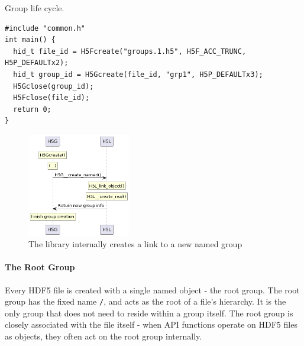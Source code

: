 \begin{listing}
\centering
\caption{Group life cycle.}
\label{lst:group-life-cycle}
\begin{verbatim}
#include "common.h"
int main() {
  hid_t file_id = H5Fcreate("groups.1.h5", H5F_ACC_TRUNC, H5P_DEFAULTx2);
  hid_t group_id = H5Gcreate(file_id, "grp1", H5P_DEFAULTx3);
  H5Gclose(group_id);
  H5Fclose(file_id);
  return 0;
}
\end{verbatim}
\end{listing}

\begin{figure}
    \centering
    \includegraphics[width=0.40\textwidth]{images/tour_4_group_create.png}
    \caption{The library internally creates a link to a new named group}
    \label{fig:tour-4-uml-group-create}
\end{figure}

\paragraph{The Root Group} Every HDF5 file is created with a single named object - the root group. The root group has the fixed name \texttt{/}, and acts as the root of a file's hierarchy. It is the only group that does not need to reside within a group itself. The root group is closely associated with the file itself - when API functions operate on HDF5 files as objects, they often act on the root group internally.

